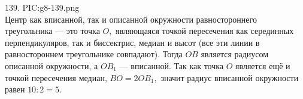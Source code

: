 139. {{PIC:g8-139.png}}\\
Центр как вписанной, так и описанной окружности равностороннего треугольника --- это точка $O,$ являющаяся точкой пересечения как серединных перпендикуляров, так и биссектрис, медиан и высот (все эти линии в равностороннем треугольнике совпадают). Тогда $OB$ является радиусом описанной окружности, а $OB_1$ --- вписанной. Так как точка $O$ является ещё и точкой пересечения медиан, $BO=2OB_1,$ значит радиус вписанной окружности равен $10:2=5.$\\
